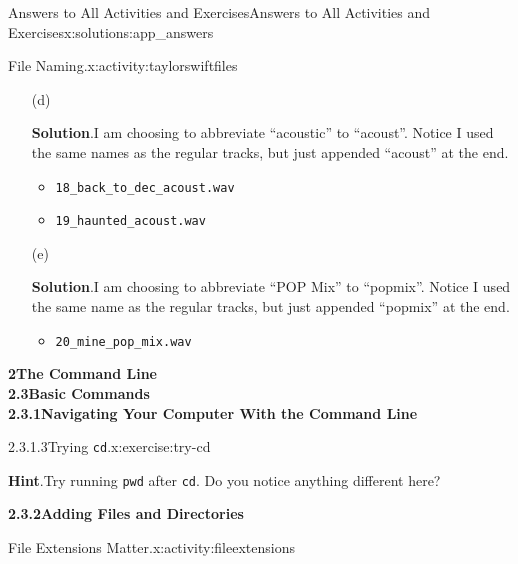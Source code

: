 \documentclass[oneside,10pt,]{book}
\newcommand{\blocktitlefont}{\relax}
\newcommand{\mono}[1]{\texttt{#1}}
\begin{document}
\begin{solutions-chapter}{Answers to All Activities and Exercises}{}{Answers to All Activities and Exercises}{}{}{x:solutions:app_answers}
\begin{activitysolution}{1.2}{File Naming.}{x:activity:taylorswiftfiles}
\begin{enumerate}[font=\bfseries,label=(\alph*),ref=\alph*]
\begin{multicols}{2}
\begin{itemize}[label=\textbullet]
\item{}\mono{17\_superman.wav}%
\end{itemize}
\end{multicols}
%
\item[(d)]\par\smallskip%
\noindent\textbf{\blocktitlefont Solution}.\hypertarget{g:solution:idm480929608-back}{}\quad{}I am choosing to abbreviate ``acoustic'' to ``acoust''. Notice I used the same names as the regular tracks, but just appended ``\textunderscore{}acoust'' at the end.%
\begin{itemize}[label=\textbullet]
\item{}\mono{18\_back\_to\_dec\_acoust.wav}%
\item{}\mono{19\_haunted\_acoust.wav}%
\end{itemize}
%
\item[(e)]\par\smallskip%
\noindent\textbf{\blocktitlefont Solution}.\hypertarget{g:solution:idm480918088-back}{}\quad{}I am choosing to abbreviate ``POP Mix'' to ``pop\textunderscore{}mix''. Notice I used the same name as the regular tracks, but just appended ``\textunderscore{}pop\textunderscore{}mix'' at the end.%
\begin{itemize}[label=\textbullet]
\item{}\mono{20\_mine\_pop\_mix.wav}%
\end{itemize}
%
\end{enumerate}
\end{activitysolution}%
\par\medskip
\noindent\textbf{\Large{}2\space\textperiodcentered\space{}The Command Line\\
2.3\space\textperiodcentered\space{}Basic Commands\\
2.3.1\space\textperiodcentered\space{}Navigating Your Computer With the Command Line}
\begin{inlinesolution}{2.3.1.3}{Trying \mono{cd}.}{x:exercise:try-cd}%
\par\smallskip%
\noindent\textbf{\blocktitlefont Hint}.\hypertarget{g:hint:idm480732872-back}{}\quad{}Try running \mono{pwd} after \mono{cd}. Do you notice anything different here?%
\end{inlinesolution}%
\par\medskip
\noindent\textbf{\Large{}2.3.2\space\textperiodcentered\space{}Adding Files and Directories}
\begin{activitysolution}{2.1}{File Extensions Matter.}{x:activity:fileextensions}%
\begin{enumerate}[font=\bfseries,label=(\alph*),ref=\alph*]

\end{enumerate}
\end{activitysolution}
\end{solutions-chapter}
\end{document}
